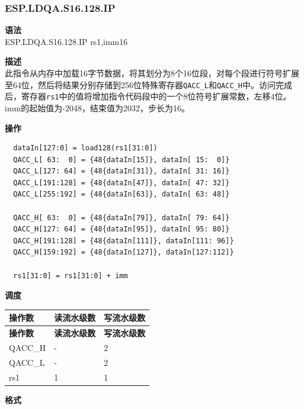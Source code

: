\newpage

\newpage
\subsubsection{ESP.LDQA.S16.128.IP}\label{instruction:ESPLDQAS16128IP}
\textbf{语法}\\
ESP.LDQA.S16.128.IP rs1,imm16

\textbf{描述}\\
此指令从内存中加载16字节数据，将其划分为8个16位段，对每个段进行符号扩展至64位，然后将结果分别存储到256位特殊寄存器\lstinline{QACC_L}和\lstinline{QACC_H}中。访问完成后，寄存器\lstinline{rs1}中的值将增加指令代码段中的一个8位符号扩展常数，左移4位。\\

imm的起始值为-2048，结束值为2032，步长为16。

\textbf{操作}
\begin{lstlisting}
  dataIn[127:0] = load128(rs1[31:0])
  QACC_L[ 63:  0] = {48{dataIn[15]}, dataIn[ 15:  0]}
  QACC_L[127: 64] = {48{dataIn[31]}, dataIn[ 31: 16]}
  QACC_L[191:128] = {48{dataIn[47]}, dataIn[ 47: 32]}
  QACC_L[255:192] = {48{dataIn[63]}, dataIn[ 63: 48]}

  QACC_H[ 63:  0] = {48{dataIn[79]}, dataIn[ 79: 64]}
  QACC_H[127: 64] = {48{dataIn[95]}, dataIn[ 95: 80]}
  QACC_H[191:128] = {48{dataIn[111]}, dataIn[111: 96]}
  QACC_H[159:192] = {48{dataIn[127]}, dataIn[127:112]}

  rs1[31:0] = rs1[31:0] + imm
\end{lstlisting}

\textbf{调度}\\
\begin{longtable}[c]{|l|l|l|}
    \hline
    \rowcolor{lightgray}
    \textbf{操作数} & \textbf{读流水级数} & \textbf{写流水级数} \\\hline
    \endfirsthead
    \hline
    \rowcolor{lightgray}
     \textbf{操作数} & \textbf{读流水级数} & \textbf{写流水级数} \\\hline
    \endhead
    \hline
    \endfoot

  QACC\_H & - & 2 \\\hline
    QACC\_L & - & 2 \\\hline
  rs1 & 1 & 1

\end{longtable}

\textbf{格式}\\


